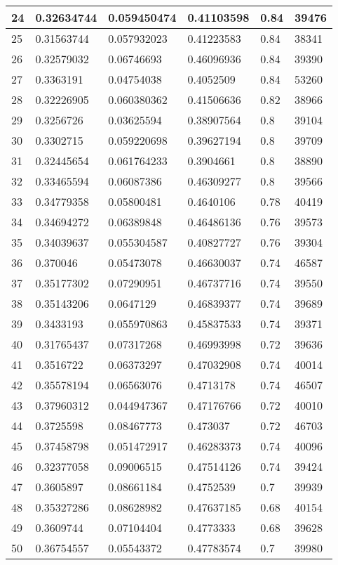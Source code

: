 \begin{longtable}{|l|l|l|l|l|l|}
24 & 0.32634744 & 0.059450474 & 0.41103598 & 0.84 & 39476 \\ \hline 
25 & 0.31563744 & 0.057932023 & 0.41223583 & 0.84 & 38341 \\ \hline 
26 & 0.32579032 & 0.06746693 & 0.46096936 & 0.84 & 39390 \\ \hline 
27 & 0.3363191 & 0.04754038 & 0.4052509 & 0.84 & 53260 \\ \hline 
28 & 0.32226905 & 0.060380362 & 0.41506636 & 0.82 & 38966 \\ \hline 
29 & 0.3256726 & 0.03625594 & 0.38907564 & 0.8 & 39104 \\ \hline 
30 & 0.3302715 & 0.059220698 & 0.39627194 & 0.8 & 39709 \\ \hline 
31 & 0.32445654 & 0.061764233 & 0.3904661 & 0.8 & 38890 \\ \hline 
32 & 0.33465594 & 0.06087386 & 0.46309277 & 0.8 & 39566 \\ \hline 
33 & 0.34779358 & 0.05800481 & 0.4640106 & 0.78 & 40419 \\ \hline 
34 & 0.34694272 & 0.06389848 & 0.46486136 & 0.76 & 39573 \\ \hline 
35 & 0.34039637 & 0.055304587 & 0.40827727 & 0.76 & 39304 \\ \hline 
36 & 0.370046 & 0.05473078 & 0.46630037 & 0.74 & 46587 \\ \hline 
37 & 0.35177302 & 0.07290951 & 0.46737716 & 0.74 & 39550 \\ \hline 
38 & 0.35143206 & 0.0647129 & 0.46839377 & 0.74 & 39689 \\ \hline 
39 & 0.3433193 & 0.055970863 & 0.45837533 & 0.74 & 39371 \\ \hline 
40 & 0.31765437 & 0.07317268 & 0.46993998 & 0.72 & 39636 \\ \hline 
41 & 0.3516722 & 0.06373297 & 0.47032908 & 0.74 & 40014 \\ \hline 
42 & 0.35578194 & 0.06563076 & 0.4713178 & 0.74 & 46507 \\ \hline 
43 & 0.37960312 & 0.044947367 & 0.47176766 & 0.72 & 40010 \\ \hline 
44 & 0.3725598 & 0.08467773 & 0.473037 & 0.72 & 46703 \\ \hline 
45 & 0.37458798 & 0.051472917 & 0.46283373 & 0.74 & 40096 \\ \hline 
46 & 0.32377058 & 0.09006515 & 0.47514126 & 0.74 & 39424 \\ \hline 
47 & 0.3605897 & 0.08661184 & 0.4752539 & 0.7 & 39939 \\ \hline 
48 & 0.35327286 & 0.08628982 & 0.47637185 & 0.68 & 40154 \\ \hline 
49 & 0.3609744 & 0.07104404 & 0.4773333 & 0.68 & 39628 \\ \hline 
50 & 0.36754557 & 0.05543372 & 0.47783574 & 0.7 & 39980 \\ \hline 
\end{longtable}